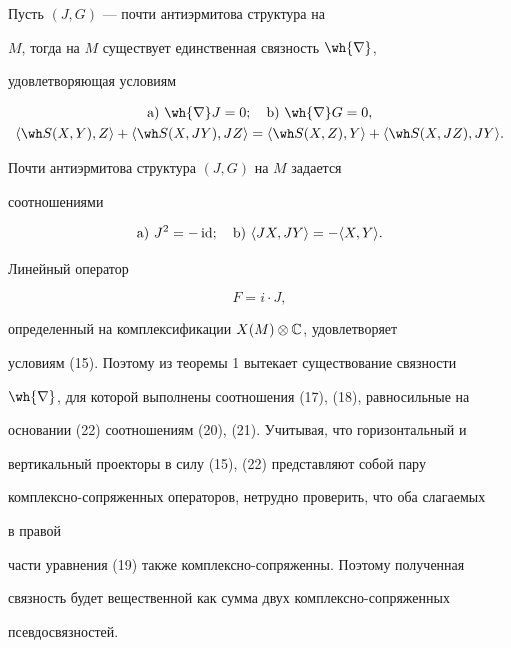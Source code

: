 \begin{cor}


Пусть $(J,G)$ --- почти антиэрмитова структура на


$M$, тогда на $M$ существует единственная связность $\wh{\nb}$,


удовлетворяющая условиям


\begin{gather}


\mathrm a)\ \wh{\nb}J=0;\quad \mathrm b)\ \wh{\nb}G=0,\\


%


\langle \wh S (X, Y), Z\rangle +


\langle\wh S (X, JY),JZ\rangle=\langle\wh S (X, Z), Y\rangle+


\langle\wh S (X,JZ),JY\rangle.


\end{gather}


\end{cor}





\begin{pf}


Почти антиэрмитова структура $(J,G)$ на $M$ задается


соотношениями


$$


\mathrm a)\ J^2=-\id;\quad


\mathrm b)\ \langle JX,JY\rangle=-\langle X,Y\rangle.


$$


Линейный оператор


\begin{equation}


F=i\cdot J,


\end{equation}


определенный на комплексификации $X(M)\otimes \Bbb { C}$, удовлетворяет


условиям (15). Поэтому из теоремы 1 вытекает существование связности


$\wh{\nb}$, для которой выполнены соотношения (17), (18), равносильные на


основании (22) соотношениям (20), (21). Учитывая, что горизонтальный и


вертикальный проекторы в силу (15), (22) представляют собой пару


комплексно-сопряженных операторов, нетрудно проверить, что оба слагаемых


в правой


части уравнения (19) также комплексно-сопряженны. Поэтому полученная


связность будет вещественной как сумма двух комплексно-сопряженных


псевдосвязностей.


\end{pf}





